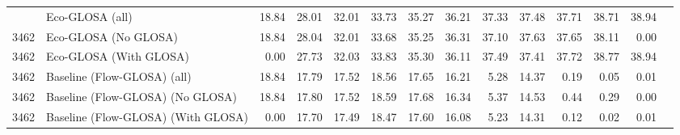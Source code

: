 \begin{table}[ht]
{\begin{tabular}{llrrrrrrrrrrrr}
        \addlinespace
        3462 & Eco-GLOSA (all)                    & 18.84 & 28.01 & 32.01 & 33.73 & 35.27 & 36.21 & 37.33 & 37.48 & 37.71 & 38.71 & 38.94 \\
        3462 & Eco-GLOSA (No GLOSA)               & 18.84 & 28.04 & 32.01 & 33.68 & 35.25 & 36.31 & 37.10 & 37.63 & 37.65 & 38.11 & 0.00 \\
        3462 & Eco-GLOSA (With GLOSA)             & 0.00 & 27.73 & 32.03 & 33.83 & 35.30 & 36.11 & 37.49 & 37.41 & 37.72 & 38.77 & 38.94 \\
        3462 & Baseline (Flow-GLOSA) (all)        & 18.84 & 17.79 & 17.52 & 18.56 & 17.65 & 16.21 & 5.28 & 14.37 & 0.19 & 0.05 & 0.01 \\
        3462 & Baseline (Flow-GLOSA) (No GLOSA)   & 18.84 & 17.80 & 17.52 & 18.59 & 17.68 & 16.34 & 5.37 & 14.53 & 0.44 & 0.29 & 0.00 \\
        3462 & Baseline (Flow-GLOSA) (With GLOSA) & 0.00 & 17.70 & 17.49 & 18.47 & 17.60 & 16.08 & 5.23 & 14.31 & 0.12 & 0.02 & 0.01 \\
        \bottomrule
      \end{tabular}
    }
\end{table}
